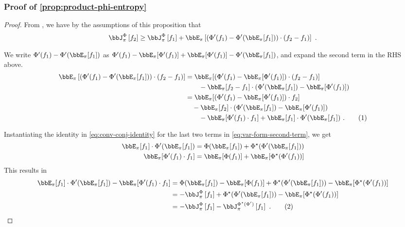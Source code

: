 \documentclass[11pt]{article}
\newcounter{ct}
\newcommand{\numberthis}{\addtocounter{equation}{1}\tag{\theequation}}
\newcommand{\Phient}[3]{
    \ensuremath{\if$#3$\bbJ_{#1}^{#2}\else\bbJ_{#1}^{#2}\left[#3\right]\fi}}
\begin{document}
\subsubsection{Proof of \cref{prop:product-phi-entropy}}
\begin{proof}
From \citet[Prop. 4]{chafai2004entropies}, we have by the assumptions of this proposition that
\begin{equation*}
    \Phient{\pi}{\Phi}{f_{2}} \geq \Phient{\pi}{\Phi}{f_{1}} + \bbE_{\pi}\left[(\Phi'(f_{1}) - \Phi'(\bbE_{\pi}[f_{1}])) \cdot (f_{2} - f_{1})\right]~.
\end{equation*}

We write \(\Phi'(f_{1}) - \Phi'(\bbE_{\pi}[f_{1}])\) as \(\Phi'(f_{1}) - \bbE_{\pi}[\Phi'(f_{1})] + \bbE_{\pi}[\Phi'(f_{1})] - \Phi'(\bbE_{\pi}[f_{1}])\), and expand the second term in the RHS above.
\begin{align*}
    \bbE_{\pi}\left[(\Phi'(f_{1}) - \Phi'(\bbE_{\pi}[f_{1}])) \cdot (f_{2} - f_{1})\right] &= \bbE_{\pi}[(\Phi'(f_{1}) - \bbE_{\pi}[\Phi'(f_{1})]) \cdot (f_{2} - f_{1})] \\
    &\qquad - \bbE_{\pi}[f_{2} - f_{1}] \cdot (\Phi'(\bbE_{\pi}[f_{1}]) - \bbE_{\pi}[\Phi'(f_{1})]) \\
    &= \bbE_{\pi}[(\Phi'(f_{1}) - \bbE_{\pi}[\Phi'(f_{1})]) \cdot f_{2}] \\
    &\quad - \bbE_{\pi}[f_{2}] \cdot (\Phi'(\bbE_{\pi}[f_{1}]) - \bbE_{\pi}[\Phi'(f_{1})]) \\
    &\qquad - \bbE_{\pi}[\Phi'(f_{1}) \cdot f_{1}] + \bbE_{\pi}[f_{1}] \cdot \Phi'(\bbE_{\pi}[f_{1}])~.\numberthis\label{eq:var-form-second-term}
\end{align*}

Instantiating the identity in \cref{eq:conv-conj-identity} for the last two terms in \cref{eq:var-form-second-term}, we get
\begin{align*}
    \bbE_{\pi}[f_{1}] \cdot \Phi'(\bbE_{\pi}[f_{1}]) &= \Phi(\bbE_{\pi}[f_{1}]) + \Phi^{\star}(\Phi'(\bbE_{\pi}[f_{1}])) \\
    \bbE_{\pi}[\Phi'(f_{1}) \cdot f_{1}] &= \bbE_{\pi}[\Phi(f_{1})] + \bbE_{\pi}[\Phi^{\star}(\Phi'(f_{1}))]
\end{align*}
This results in
\begin{align*}
    \bbE_{\pi}[f_{1}] \cdot \Phi'(\bbE_{\pi}[f_{1}]) - \bbE_{\pi}[\Phi'(f_{1}) \cdot f_{1}] &= \Phi(\bbE_{\pi}[f_{1}]) - \bbE_{\pi}[\Phi(f_{1})] + \Phi^{\star}(\Phi'(\bbE_{\pi}[f_{1}])) - \bbE_{\pi}[\Phi^{\star}(\Phi'(f_{1}))]  \\
    &= -\Phient{\pi}{\Phi}{f_{1}} + \Phi^{\star}(\Phi'(\bbE_{\pi}[f_{1}])) - \bbE_{\pi}[\Phi^{\star}(\Phi'(f_{1}))] \\
    &= -\Phient{\pi}{\Phi}{f_{1}} - \Phient{\pi}{\Phi^{\star}(\Phi')}{f_{1}}~.\numberthis\label{eq:conv-conj-simplify}
\end{align*}


\end{proof}
\end{document}
